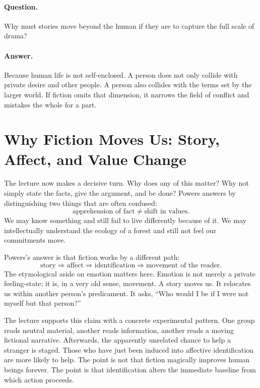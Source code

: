 \paragraph{Question.} Why must stories move beyond the human if they are to capture the full scale of drama?

\paragraph{Answer.} Because human life is not self-enclosed. A person does not only collide with private desire and other people. A person also collides with the terms set by the larger world. If fiction omits that dimension, it narrows the field of conflict and mistakes the whole for a part.

\section{Why Fiction Moves Us: Story, Affect, and Value Change}

The lecture now makes a decisive turn. Why does any of this matter? Why not simply state the facts, give the argument, and be done? Powers answers by distinguishing two things that are often confused:
\begin{equation}
\text{apprehension of fact} \neq \text{shift in values}.
\end{equation}
We may know something and still fail to live differently because of it. We may intellectually understand the ecology of a forest and still not feel our commitments move.

Powers's answer is that fiction works by a different path:
\begin{equation}
\text{story} \Rightarrow \text{affect} \Rightarrow \text{identification} \Rightarrow \text{movement of the reader}.
\end{equation}
The etymological aside on emotion matters here. Emotion is not merely a private feeling-state; it is, in a very old sense, movement. A story moves us. It relocates us within another person's predicament. It asks, ``Who would I be if I were not myself but that person?''

The lecture supports this claim with a concrete experimental pattern. One group reads neutral material, another reads information, another reads a moving fictional narrative. Afterwards, the apparently unrelated chance to help a stranger is staged. Those who have just been induced into affective identification are more likely to help. The point is not that fiction magically improves human beings forever. The point is that identification alters the immediate baseline from which action proceeds.

